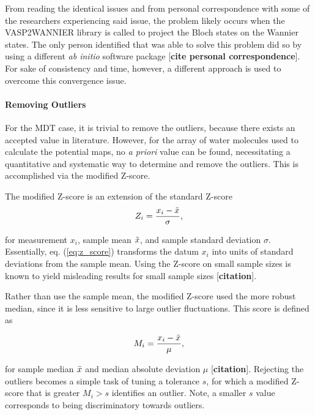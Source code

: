         From reading the identical issues and from personal correspondence with some of the researchers experiencing said issue, the problem likely occurs when the VASP2WANNIER library is called to project the Bloch states on the Wannier states. The only person identified that was able to solve this problem did so by using a different \textit{ab initio} software package [\textbf{cite personal correspondence}]. For sake of consistency and time, however, a different approach is used to overcome this convergence issue.
        
        \paragraph{Removing Outliers} For the MDT case, it is trivial to remove the outliers, because there exists an accepted value in literature. However, for the array of water molecules used to calculate the potential maps, no \textit{a priori} value can be found, necessitating a quantitative and systematic way to determine and remove the outliers. This is accomplished via the modified Z-score.
        
        The modified Z-score is an extension of the standard Z-score 
        \begin{equation}
        \label{eq:z_score}
            Z_i = \frac{x_i - \Tilde{x}}{\sigma},
        \end{equation}
        
        \noindent for measurement $x_i$, sample mean $\Tilde{x}$, and sample standard deviation $\sigma$. Essentially, eq. (\ref{eq:z_score}) transforms the datum $x_i$ into units of standard deviations from the sample mean. Using the Z-score on small sample sizes is known to yield misleading results for small sample sizes [\textbf{citation}].
        
        Rather than use the sample mean, the modified Z-score used the more robust median, since it is less sensitive to large outlier fluctuations. This score is defined as
        
        \begin{equation}
            M_i = \frac{x_i - \Bar{x}}{\mu},
        \end{equation}
        
        \noindent for sample median $\Bar{x}$ and median absolute deviation $\mu$ [\textbf{citation}]. Rejecting the outliers becomes a simple task of tuning a tolerance $s$, for which a modified Z-score that is greater $M_i>s$ identifies an outlier. Note, a smaller $s$ value corresponds to being discriminatory towards outliers.
        
